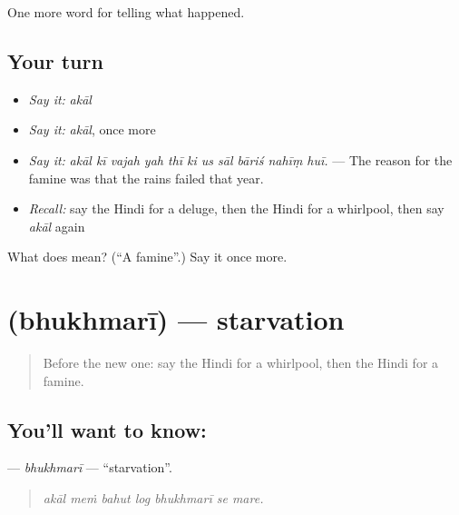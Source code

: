 \begin{grammarlens}[title={What you've built}]
One more word for telling what happened.
\end{grammarlens}

\subsection*{Your turn}
\begin{itemize}
\raggedright
  \item \emph{Say it:} \emph{akāl}
  \item \emph{Say it:} \emph{akāl}, once more
  \item \emph{Say it:} \emph{akāl kī vajah yah thī ki us sāl bāriś nahīṃ huī.} — The reason for the famine was that the rains failed that year.
  \item \emph{Recall:} say the Hindi for a deluge, then the Hindi for a whirlpool, then say \emph{akāl} again
\end{itemize}

\begin{tcolorbox}[breakable,colback=teal!4,colframe=teal!35!black,title={Before you move on}]
What does  mean? (\textquotedblleft{}A famine\textquotedblright{}.) Say it once more.
\end{tcolorbox}
\section[\texorpdfstring{\hi{भुखमरी} (bhukhmarī)}{भुखमरी (bhukhmarī)}]{ (bhukhmarī) — starvation}

\label{lesson:HI-C306-bhukhmari}



\begin{quote}
Before the new one: say the Hindi for a whirlpool, then the Hindi for a famine.
\end{quote}

\subsection*{You'll want to know: }
\textbf{} — \emph{bhukhmarī} — \textquotedblleft{}starvation\textquotedblright{}.

\begin{quote}
      
\end{quote}

\begin{quote}
\emph{akāl meṁ bahut log bhukhmarī se mare.}
\end{quote}

